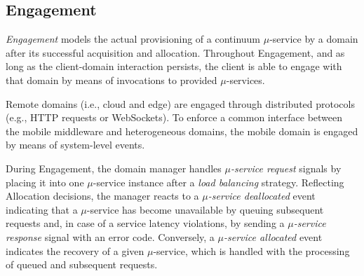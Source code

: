 



\subsection{Engagement}\label{sec:A3-E-engagement}

\textit{Engagement} models the actual provisioning of a continuum $\mu$-service by a domain after its successful acquisition and allocation.
Throughout Engagement, and as long as the client-domain interaction persists, the client is able to engage with that domain by means of invocations to provided $\mu$-services. 

Remote domains (i.e., cloud and edge) are engaged through distributed protocols (e.g., HTTP requests or WebSockets). To enforce a common interface between the mobile middleware and heterogeneous domains, the mobile domain is engaged by means of system-level events.

During Engagement, the domain manager handles \textit{$\mu$-service request} signals by placing it into one $\mu$-service instance after a \textit{load balancing} strategy. Reflecting Allocation decisions, the manager reacts to a \textit{$\mu$-service deallocated} event 
indicating that a $\mu$-service has become unavailable 
by queuing subsequent requests and, in case of a service latency violations, by sending a \textit{$\mu$-service response} signal with an error code. Conversely, a \textit{$\mu$-service allocated} event indicates the recovery of a given $\mu$-service, which is handled with the processing of queued and subsequent requests. 

